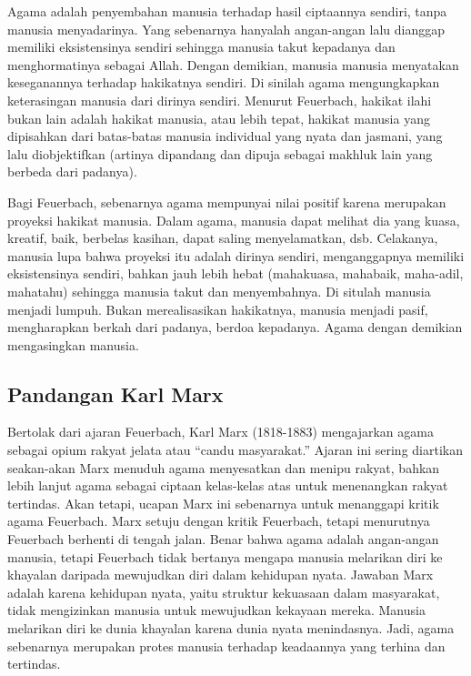 \documentclass[11pt,twoside,a5paper,openany]{memoir}
\begin{document}
Agama adalah penyembahan manusia terhadap hasil ciptaannya sendiri,
tanpa manusia menyadarinya. Yang sebenarnya hanyalah angan-angan lalu
dianggap memiliki eksistensinya sendiri sehingga manusia takut kepadanya
dan menghormatinya sebagai Allah. Dengan demikian, manusia manusia
menyatakan keseganannya terhadap hakikatnya sendiri. Di sinilah agama
mengungkapkan keterasingan manusia dari dirinya sendiri. Menurut
Feuerbach, hakikat ilahi bukan lain adalah hakikat manusia, atau lebih
tepat, hakikat manusia yang dipisahkan dari batas-batas manusia
individual yang nyata dan jasmani, yang lalu diobjektifkan (artinya
dipandang dan dipuja sebagai makhluk lain yang berbeda dari padanya).

Bagi Feuerbach, sebenarnya agama mempunyai nilai positif karena
merupakan proyeksi hakikat manusia. Dalam agama, manusia dapat melihat
dia yang kuasa, kreatif, baik, berbelas kasihan, dapat saling
menyelamatkan, dsb. Celakanya, manusia lupa bahwa proyeksi itu adalah
dirinya sendiri, menganggapnya memiliki eksistensinya sendiri, bahkan
jauh lebih hebat (mahakuasa, mahabaik, maha-adil, mahatahu) sehingga
manusia takut dan menyembahnya. Di situlah manusia menjadi lumpuh. Bukan
merealisasikan hakikatnya, manusia menjadi pasif, mengharapkan berkah
dari padanya, berdoa kepadanya. Agama dengan demikian mengasingkan
manusia.

\hypertarget{pandangan-karl-marx}{%
\subsection{Pandangan Karl Marx}\label{pandangan-karl-marx}}

Bertolak dari ajaran Feuerbach, Karl Marx (1818-1883) mengajarkan agama
sebagai opium rakyat jelata atau ``candu masyarakat.'' Ajaran ini sering
diartikan seakan-akan Marx menuduh agama menyesatkan dan menipu rakyat,
bahkan lebih lanjut agama sebagai ciptaan kelas-kelas atas untuk
menenangkan rakyat tertindas. Akan tetapi, ucapan Marx ini sebenarnya
untuk menanggapi kritik agama Feuerbach. Marx setuju dengan kritik
Feuerbach, tetapi menurutnya Feuerbach berhenti di tengah jalan. Benar
bahwa agama adalah angan-angan manusia, tetapi Feuerbach tidak bertanya
mengapa manusia melarikan diri ke khayalan daripada mewujudkan diri
dalam kehidupan nyata. Jawaban Marx adalah karena kehidupan nyata, yaitu
struktur kekuasaan dalam masyarakat, tidak mengizinkan manusia untuk
mewujudkan kekayaan mereka. Manusia melarikan diri ke dunia khayalan
karena dunia nyata menindasnya. Jadi, agama sebenarnya merupakan protes
manusia terhadap keadaannya yang terhina dan tertindas.
\end{document}
